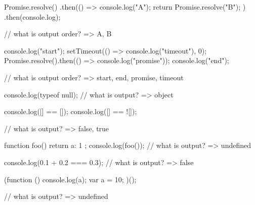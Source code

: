 Promise.resolve()
  .then(() => {
    console.log("A");
    return Promise.resolve("B");
  })
  .then(console.log);

// what is output order? => A, B

console.log("start");
setTimeout(() => console.log("timeout"), 0);
Promise.resolve().then(() => console.log("promise"));
console.log("end");

// what is output order? => start, end, promise, timeout

console.log(typeof null);
// what is output? => object

console.log([] == []);
console.log([] == ![]);

// what is output? => false, true

function foo() {
  return
  {
    a: 1
  };
}
console.log(foo());
// what is output? => undefined

console.log(0.1 + 0.2 === 0.3);
// what is output? => false

(function () {
  console.log(a);
  var a = 10;
})();

// what is output? => undefined